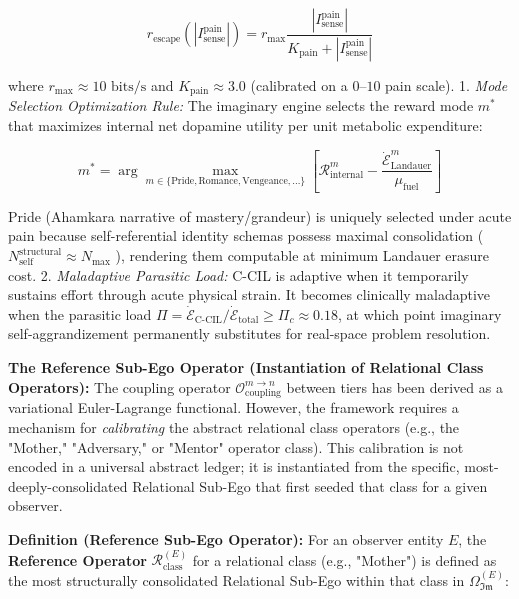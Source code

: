 \documentclass[11pt,a4paper]{article}
\theoremstyle{definition}
\theoremstyle{remark}
\begin{document}
\begin{equation}
\boxed{r_{\text{escape}}\left(|I_{\text{sense}}^{\text{pain}}|\right) = r_{\max} \frac{|I_{\text{sense}}^{\text{pain}}|}{K_{\text{pain}} + |I_{\text{sense}}^{\text{pain}}|}}
\end{equation}


where $r_{\max} \approx 10\text{ bits/s}$ and $K_{\text{pain}} \approx 3.0$ (calibrated on a $0\text{--}10$ pain scale).
1. \textit{Mode Selection Optimization Rule:} The imaginary engine selects the reward mode $m^*$ that maximizes internal net dopamine utility per unit metabolic expenditure:


\begin{equation}
m^* = \arg\max_{m \in \{\text{Pride}, \text{Romance}, \text{Vengeance}, \dots\}} \left[ \mathcal{R}_{\text{internal}}^m - \frac{\dot{\mathcal{E}}_{\text{Landauer}}^m}{\mu_{\text{fuel}}} \right]
\end{equation}


Pride (Ahamkara narrative of mastery/grandeur) is uniquely selected under acute pain because self-referential identity schemas possess maximal consolidation ( $N_{\text{self}}^{\text{structural}} \approx N_{\max}$ ), rendering them computable at minimum Landauer erasure cost.
2. \textit{Maladaptive Parasitic Load:} C-CIL is adaptive when it temporarily sustains effort through acute physical strain. It becomes clinically maladaptive when the parasitic load $\Pi = \dot{\mathcal{E}}_{\text{C-CIL}} / \dot{\mathcal{E}}_{\text{total}} \ge \Pi_c \approx 0.18$, at which point imaginary self-aggrandizement permanently substitutes for real-space problem resolution.

\textbf{The Reference Sub-Ego Operator (Instantiation of Relational Class Operators):} The coupling operator $\mathcal{O}_{\text{coupling}}^{m \to n}$ between tiers has been derived as a variational Euler-Lagrange functional. However, the framework requires a mechanism for \textit{calibrating} the abstract relational class operators (e.g., the "Mother," "Adversary," or "Mentor" operator class). This calibration is not encoded in a universal abstract ledger; it is instantiated from the specific, most-deeply-consolidated Relational Sub-Ego that first seeded that class for a given observer.

\textbf{Definition (Reference Sub-Ego Operator):} For an observer entity $E$, the \textbf{Reference Operator} $\mathcal{R}_{\text{class}}^{(E)}$ for a relational class (e.g., "Mother") is defined as the most structurally consolidated Relational Sub-Ego within that class in $\Omega_{\mathfrak{Im}}^{(E)}$:
\end{document}
